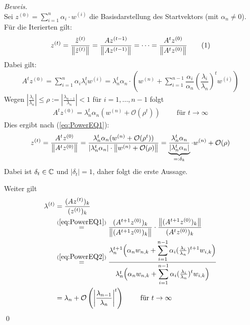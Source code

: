 \textit{Beweis.} \\
Sei $z^{(0)}=\displaystyle\sum_{i=1}^n \alpha_i\cdot w^{(i)}$ die Basisdarstellung des Startvektors 
(mit $\alpha_n\neq 0$). Für die Iterierten gilt:
%
\begin{align*}
  z^{(t)} 
  = \dfrac{\tilde{z}^{(t)}}{\vertn{2}{\tilde{z}^{(t)}}} 
  = \dfrac{Az^{(t-1)}}{\vertn{2}{Az^{(t-1)}}} 
  = \dots 
  = \dfrac{A^tz^{(0)}}{\vertn{2}{A^tz^{(0)}}}
  \tag{1}\label{eq:PowerEQ1}
\end{align*}
%
Dabei gilt:
%
\begin{align*}
  A^tz^{(0)} 
  = \sum_{i=1}^{n}\alpha_i\lambda_i^tw^{(i)} 
  = \lambda_n^t \alpha_n\cdot\left(w^{(n)} + 
  \sum_{i=1}^{n-1} \dfrac{\alpha_i}{\alpha_n}\left(\dfrac{\lambda_i}{\lambda_n}\right)^t w^{(i)}\right)
  \tag{2}\label{eq:PowerEQ2}
\end{align*}
%
Wegen $|\tfrac{\lambda_i}{\lambda_n}|\leq \rho:=|\tfrac{\lambda_{n-1}}{\lambda_n}|<1$ für $i=1,\dots,n-1$ folgt
\begin{align*}
  A^tz^{(0)} 
  = \lambda_n^t\alpha_n(w^{(n)}+\mathcal{O}(\rho^t))
  \qquad \text{ für } t\rightarrow \infty
\end{align*}
%
Dies ergibt nach (\ref{eq:PowerEQ1}):
%
\begin{align*}
  z^{(t)} 
  = \dfrac{A^tz^{(0)}}{\vertn{2}{A^tz^{(0)}}}
  = \dfrac{\lambda_n^t\alpha_n(w^{(n)}+\mathcal{O}(\rho^t))}
  {|\lambda_n^t\alpha_n|\cdot\vertn{2}{w^{(n)}+\mathcal{O}(\rho)}}
  = \underbrace{\dfrac{\lambda_n^t\alpha_n}{|\lambda_n^t\alpha_n|}}_{=:\delta_k}\cdot w^{(n)}+\mathcal{O}(\rho)
\end{align*}
%
Dabei ist $\delta_t\in\mathbb C$ und $|\delta_t|=1$, daher folgt die erste Aussage.

Weiter gilt 
%
\begin{align*}
  \lambda^{(t)} 
  &= \dfrac{(Az^{(t)})_k}{(z^{(t)})_k} \\
  &\stackrel{(\ref{eq:PowerEQ1})}{=} 
  \dfrac{(A^{t+1}z^{(0)})_k}{\vertn{2}{(A^{t+1}z^{(0)})_k}}\cdot\dfrac{{\vertn{2}{(A^{t+1}z^{(0)})_k}}}{(A^tz^{(0)})_k} \\
  &\stackrel{(\ref{eq:PowerEQ2})}{=} 
  \dfrac{\lambda_n^{t+1}\Big(\alpha_n w_{n,k} 
  + \displaystyle\sum_{i=1}^{n-1} \alpha_i(\tfrac{\lambda_i}{\lambda_n})^{t+1}w_{i,k}\Big)}
  {\lambda_n^t\Big(\alpha_n w_{n,k} 
  + \displaystyle\sum_{i=1}^{n-1} \alpha_i(\tfrac{\lambda_i}{\lambda_n})^{t}w_{i,k}\Big)} \\
  &= \lambda_n + \mathcal{O}\left(\left|\dfrac{\lambda_{n-1}}{\lambda_n}\right|^t\right)\qquad 
  \text{ für } t\rightarrow \infty
\end{align*}
%
\qed

